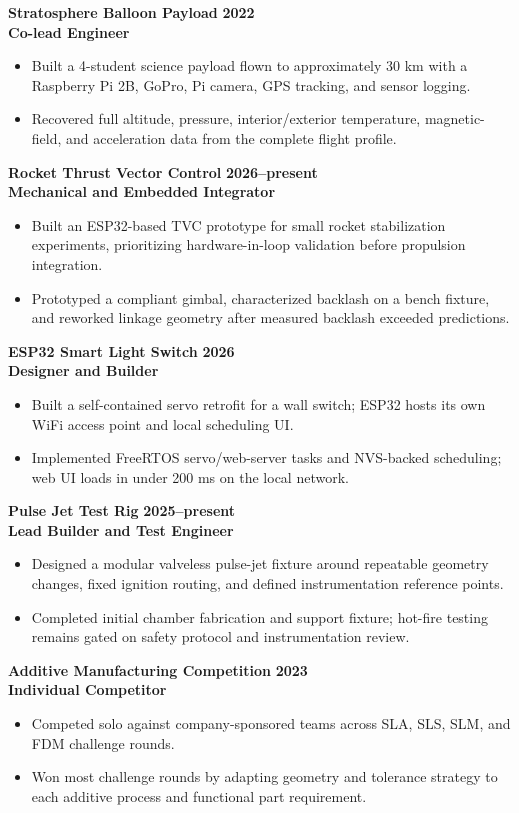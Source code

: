 \documentclass[10pt,letterpaper]{article}
\newcommand{\project}[4]{
  \textbf{#1} \hfill {\color{muted}\textbf{#4}}\\
  {\color{accent}\textbf{#2}} \hfill {\color{muted}#3}
  \vspace{2pt}
}
\begin{document}
\project{Stratosphere Balloon Payload}{Co-lead Engineer}{}{2022}
\begin{itemize}
  \item Built a 4-student science payload flown to approximately 30 km with a Raspberry Pi 2B, GoPro, Pi camera, GPS tracking, and sensor logging.
  \item Recovered full altitude, pressure, interior/exterior temperature, magnetic-field, and acceleration data from the complete flight profile.
\end{itemize}

\project{Rocket Thrust Vector Control}{Mechanical and Embedded Integrator}{}{2026--present}
\begin{itemize}
  \item Built an ESP32-based TVC prototype for small rocket stabilization experiments, prioritizing hardware-in-loop validation before propulsion integration.
  \item Prototyped a compliant gimbal, characterized backlash on a bench fixture, and reworked linkage geometry after measured backlash exceeded predictions.
\end{itemize}

\project{ESP32 Smart Light Switch}{Designer and Builder}{}{2026}
\begin{itemize}
  \item Built a self-contained servo retrofit for a wall switch; ESP32 hosts its own WiFi access point and local scheduling UI.
  \item Implemented FreeRTOS servo/web-server tasks and NVS-backed scheduling; web UI loads in under 200 ms on the local network.
\end{itemize}

\project{Pulse Jet Test Rig}{Lead Builder and Test Engineer}{}{2025--present}
\begin{itemize}
  \item Designed a modular valveless pulse-jet fixture around repeatable geometry changes, fixed ignition routing, and defined instrumentation reference points.
  \item Completed initial chamber fabrication and support fixture; hot-fire testing remains gated on safety protocol and instrumentation review.
\end{itemize}

\project{Additive Manufacturing Competition}{Individual Competitor}{}{2023}
\begin{itemize}
  \item Competed solo against company-sponsored teams across SLA, SLS, SLM, and FDM challenge rounds.
  \item Won most challenge rounds by adapting geometry and tolerance strategy to each additive process and functional part requirement.
\end{itemize}
\end{document}
